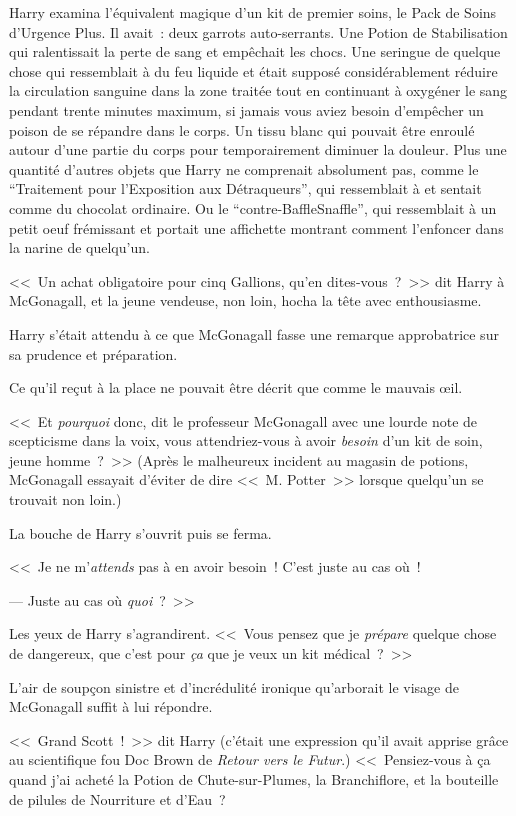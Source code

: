 Harry examina l'équivalent magique d'un kit de premier soins, le Pack de Soins d'Urgence Plus. Il avait~: deux garrots auto-serrants. Une Potion de Stabilisation qui ralentissait la perte de sang et empêchait les chocs. Une seringue de quelque chose qui ressemblait à du feu liquide et était supposé considérablement réduire la circulation sanguine dans la zone traitée tout en continuant à oxygéner le sang pendant trente minutes maximum, si jamais vous aviez besoin d'empêcher un poison de se répandre dans le corps. Un tissu blanc qui pouvait être enroulé autour d'une partie du corps pour temporairement diminuer la douleur. Plus une quantité d'autres objets que Harry ne comprenait absolument pas, comme le “Traitement pour l'Exposition aux Détraqueurs”, qui ressemblait à et sentait comme du chocolat ordinaire. Ou le “contre-BaffleSnaffle”, qui ressemblait à un petit oeuf frémissant et portait une affichette montrant comment l'enfoncer dans la narine de quelqu'un.

<<~Un achat obligatoire pour cinq Gallions, qu'en dites-vous~?~>> dit Harry à McGonagall, et la jeune vendeuse, non loin, hocha la tête avec enthousiasme.

Harry s'était attendu à ce que McGonagall fasse une remarque approbatrice sur sa prudence et préparation.

Ce qu'il reçut à la place ne pouvait être décrit que comme le mauvais œil.

<<~Et \emph{pourquoi} donc, dit le professeur McGonagall avec une lourde note de scepticisme dans la voix, vous attendriez-vous à avoir \emph{besoin} d'un kit de soin, jeune homme~?~>> (Après le malheureux incident au magasin de potions, McGonagall essayait d'éviter de dire <<~M. Potter~>> lorsque quelqu'un se trouvait non loin.)

La bouche de Harry s'ouvrit puis se ferma. 

<<~Je ne m'\emph{attends} pas à en avoir besoin~! C'est juste au cas où~!

--- Juste au cas où \emph{quoi}~?~>>

Les yeux de Harry s'agrandirent. <<~Vous pensez que je \emph{prépare} quelque chose de dangereux, que c'est pour \emph{ça} que je veux un kit médical~?~>>

L'air de soupçon sinistre et d'incrédulité ironique qu'arborait le visage de McGonagall suffit à lui répondre.

<<~Grand Scott~!~>> dit Harry (c'était une expression qu'il avait apprise grâce au scientifique fou Doc Brown de \emph{Retour vers le Futur}.) <<~Pensiez-vous à ça quand j'ai acheté la Potion de Chute-sur-Plumes, la Branchiflore, et la bouteille de pilules de Nourriture et d'Eau~?

